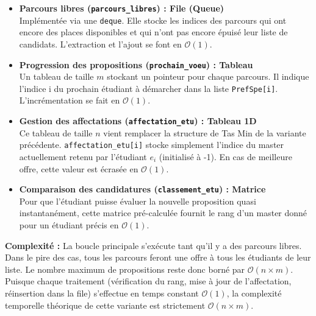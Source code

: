 \documentclass{article}
\begin{document}
\begin{itemize}
    \item \textbf{Parcours libres (\texttt{parcours\_libres}) : File (Queue)} \\
    Implémentée via une \texttt{deque}. Elle stocke les indices des parcours qui ont encore des places disponibles et qui n'ont pas encore épuisé leur liste de candidats. L'extraction et l'ajout se font en $\mathcal{O}(1)$.

    \item \textbf{Progression des propositions (\texttt{prochain\_voeu}) : Tableau} \\
    Un tableau de taille $m$ stockant un pointeur pour chaque parcours. Il indique l'indice i du prochain étudiant à démarcher dans la liste \texttt{PrefSpe[i]}. L'incrémentation se fait en $\mathcal{O}(1)$.

    \item \textbf{Gestion des affectations (\texttt{affectation\_etu}) : Tableau 1D} \\
    Ce tableau de taille $n$ vient remplacer la structure de Tas Min de la variante précédente. \texttt{affectation\_etu[i]} stocke simplement l'indice du master actuellement retenu par l'étudiant $e_i$ (initialisé à -1). En cas de meilleure offre, cette valeur est écrasée en $\mathcal{O}(1)$.

    \item \textbf{Comparaison des candidatures (\texttt{classement\_etu}) : Matrice} \\
    Pour que l'étudiant puisse évaluer la nouvelle proposition quasi instantanément, cette matrice pré-calculée fournit le rang d'un master donné pour un étudiant précis en $\mathcal{O}(1)$.
\end{itemize}

\vspace{0.3cm}
\noindent\textbf{Complexité : }
La boucle principale s'exécute tant qu'il y a des parcours libres. Dans le pire des cas, tous les parcours feront une offre à tous les étudiants de leur liste. Le nombre maximum de propositions reste donc borné par $\mathcal{O}(n \times m)$. Puisque chaque traitement (vérification du rang, mise à jour de l'affectation, réinsertion dans la file) s'effectue en temps constant $\mathcal{O}(1)$, la complexité temporelle théorique de cette variante est strictement $\mathcal{O}(n \times m)$.
\end{document}
